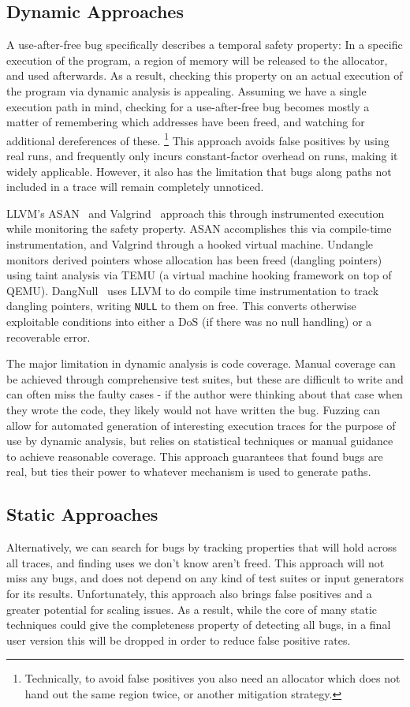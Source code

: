 \subsection{Dynamic Approaches}
A use-after-free bug specifically describes a temporal safety property:
In a specific execution of the program, a region of memory will be released to the allocator, and used afterwards.
As a result, checking this property on an actual execution of the program via dynamic analysis is appealing.
Assuming we have a single execution path in mind, checking for a use-after-free bug becomes mostly a matter of remembering which addresses have been freed, and watching for additional dereferences of these.
\footnote{Technically, to avoid false positives you also need an allocator which does not hand out the same region twice, or another mitigation strategy.}
This approach avoids false positives by using real runs, and frequently only incurs constant-factor overhead on runs, making it widely applicable.
However, it also has the limitation that bugs along paths not included in a trace will remain completely unnoticed.

LLVM's ASAN~\cite{asan} and Valgrind~\cite{valgrind} approach this through instrumented execution while monitoring the safety property.
ASAN accomplishes this via compile-time instrumentation, and Valgrind through a hooked virtual machine.
Undangle~\cite{undangle} monitors derived pointers whose allocation has been freed (dangling pointers) using taint analysis via TEMU (a virtual machine hooking framework on top of QEMU).
DangNull~\cite{dangnull} uses LLVM to do compile time instrumentation to track dangling pointers, writing \texttt{NULL} to them on free.
This converts otherwise exploitable conditions into either a DoS (if there was no null handling) or a recoverable error.

The major limitation in dynamic analysis is code coverage.
Manual coverage can be achieved through comprehensive test suites, but these are difficult to write and can often miss the faulty cases - if the author were thinking about that case when they wrote the code, they likely would not have written the bug.
Fuzzing can allow for automated generation of interesting execution traces for the purpose of use by dynamic analysis, but relies on statistical techniques or manual guidance to achieve reasonable coverage.
This approach guarantees that found bugs are real, but ties their power to whatever mechanism is used to generate paths.

\subsection{Static Approaches}
Alternatively, we can search for bugs by tracking properties that will hold across all traces, and finding uses we don't know aren't freed.
This approach will not miss any bugs, and does not depend on any kind of test suites or input generators for its results.
Unfortunately, this approach also brings false positives and a greater potential for scaling issues.
As a result, while the core of many static techniques could give the completeness property of detecting all bugs, in a final user version this will be dropped in order to reduce false positive rates.

